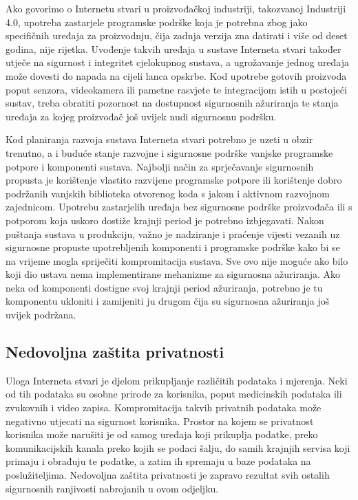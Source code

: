 \documentclass[times, utf8, diplomski]{fer}
\begin{document}
Ako govorimo o Internetu stvari u proizvođačkoj industriji, takozvanoj Industriji 4.0, upotreba zastarjele programske podrške koja je potrebna zbog jako specifičnih uređaja za proizvodnju, čija zadnja verzija zna datirati i više od deset godina, nije rijetka. Uvođenje takvih uređaja u sustave Interneta stvari također utječe na sigurnost i integritet cjelokupnog sustava, a ugrožavanje jednog uređaja može dovesti do napada na cijeli lanca opskrbe. Kod upotrebe gotovih proizvoda poput senzora, videokamera ili pametne rasvjete te integracijom istih u postojeći sustav, treba obratiti pozornost na dostupnost sigurnosnih ažuriranja te stanja uređaja za kojeg proizvođač još uvijek nudi sigurnosnu podršku.

Kod planiranja razvoja sustava Interneta stvari potrebno je uzeti u obzir trenutno, a i buduće stanje razvojne i sigurnosne podrške vanjske programske potpore i komponenti sustava. Najbolji način za sprječavanje sigurnosnih propusta je korištenje vlastito razvijene programske potpore ili korištenje dobro podržanih vanjskih biblioteka otvorenog koda s jakom i aktivnom razvojnom zajednicom. Upotrebu zastarjelih uređaja bez sigurnosne podrške proizvođača ili s potporom koja uskoro dostiže krajnji period  je potrebno izbjegavati. Nakon puštanja sustava u produkciju, važno je nadziranje i praćenje vijesti vezanih uz sigurnosne propuste upotrebljenih komponenti i programske podrške kako bi se na vrijeme mogla spriječiti kompromitacija sustava. Sve ovo nije moguće ako bilo koji dio ustava nema implementirane mehanizme za sigurnosna ažuriranja. Ako neka od komponenti dostigne svoj krajnji period ažuriranja, potrebno je tu komponentu ukloniti i zamijeniti ju drugom čija su sigurnosna ažuriranja još uvijek podržana.  

\subsection{Nedovoljna zaštita privatnosti}
Uloga Interneta stvari je djelom prikupljanje različitih podataka i mjerenja. Neki od tih podataka su osobne prirode za korisnika, poput medicinskih podataka ili zvukovnih i video zapisa. Kompromitacija takvih privatnih podataka može negativno utjecati na sigurnost korisnika. Prostor na kojem se privatnost korisnika može narušiti je od samog uređaja koji prikuplja podatke, preko komunikacijskih kanala preko kojih se podaci šalju, do samih krajnjih servisa koji primaju i obrađuju te podatke, a zatim ih spremaju u baze podataka na poslužiteljima. Nedovoljna zaštita privatnosti je zapravo rezultat svih ostalih sigurnosnih ranjivosti nabrojanih u ovom odjeljku. 
\end{document}
